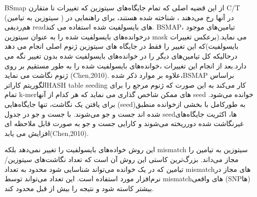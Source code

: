 BSmap از این قضیه اصلی که تمام جایگاه‌های سیتوزین‌ که تغییرات نا متقارن C/T (سیتوزین به تیامین ) در آنها رخ می‌دهند ، شناخته شده هستند، برای راهنمایی در هم‌ردیفی readهای بایسولفیت شده استفاده می کند. BSMAP، تیامین‌های موجود درخوانده‌های بایسولفیت شده را به عنوان سیتوزین‌ mask می نماید.(برعکس تغییرات بایسولفیت)که این تغییر را فقط در جایگاه های سیتوزین‌ ژنوم اصلی انجام می دهد درحالیکه کل تیامین‌های دیگر را در خوانده‌های بایسولفیت شده بدون تغییر نگه می دارد.بعد از انجام این تغییرات ،خوانده‌های بایسولفیت شده را به طور مستقیم بر روی ژنوم نگاشت می نماید (Chen,2010).
علاوه بر موارد ذکر شده،BSMAP براساس الگوریتم کارا‌ترHASH table seeding  کار می‌کند به این صورت که ژنوم مرجع را برای تمام k-merهای ممکن شاخص گذاری می نماید که هر کدام از آنها seed خوانده می‌شود. برای یافتن یک نگاشت، تنها جایگاه‌هایی (seed)به طورکامل با بخشی ازخوانده منطبق شده اند جست و جو می‌شوند. با جست و جو در جدول seedها، اکثریت جایگاه‌های غیرنگاشت شده دورریخته می‌شوند و کارایی جست و جو به صورت قابل ملاحظه ای افزایش می یابد(Chen,2010).


این روش خواده‌های بایسولفیت را تغییر نمی‌دهد بلکه mismatch سیتوزین به تیامین را مجاز می‌داند. بزرگ‌ترین کاستی این روش آن است که تعداد نگاشت‌های سیتوزین/تیامین که در یک خوانده می‌تواند شناسایی شود محدود به تعداد mismatchهای مجاز در نرم‌افزار مورد استفاده است. این تعداد می‌تواند توسط mismatchهای واقعی (SNPها) بیشتر کاسته شود و نتیجه را بیش از قبل محدود کند.



